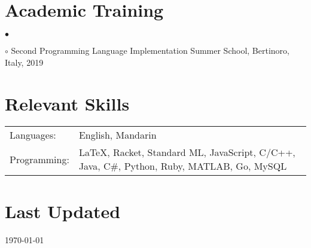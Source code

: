 \documentclass[margin,line]{res}
\newenvironment{list2}{
  \begin{list}{$\bullet$}{%
      \setlength{\itemsep}{0in}
      \setlength{\parsep}{0in} \setlength{\parskip}{0in}
      \setlength{\topsep}{0in} \setlength{\partopsep}{0in}
      \setlength{\leftmargin}{0.2in}}}{\end{list}}
\begin{document}
\begin{resume}
\section{\sc Academic Training}

\begin{list2}
\item[$\circ$] Second Programming Language Implementation Summer School, Bertinoro, Italy, 2019
\end{list2}


\section{\sc Relevant Skills}

\begin{tabular}{@{}p{0.8in}p{4.25in}}

Languages:& English, Mandarin \\
Programming:& \LaTeX, Racket, Standard ML, JavaScript, C/C++, Java, C\#, Python, Ruby, MATLAB, Go, MySQL

\end{tabular}


\section{\sc Last Updated}
\today


\end{resume}
\end{document}
